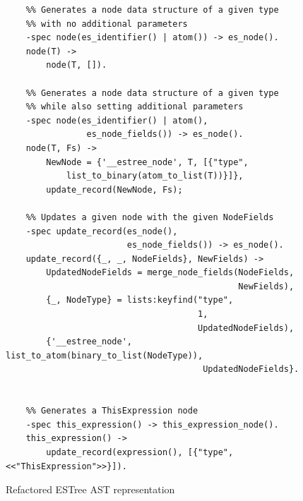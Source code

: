 \documentclass[twoside,12pt,titlepage,a4paper]{article}
\begin{document}
\begin{figure}[th]
	\centering
	\begin{verbatim}
	%% Generates a node data structure of a given type 
	%% with no additional parameters
	-spec node(es_identifier() | atom()) -> es_node().
	node(T) ->
		node(T, []).
	
	%% Generates a node data structure of a given type 
	%% while also setting additional parameters
	-spec node(es_identifier() | atom(),
				es_node_fields()) -> es_node().
	node(T, Fs) ->
		NewNode = {'__estree_node', T, [{"type", 
		    list_to_binary(atom_to_list(T))}]},
		update_record(NewNode, Fs);

	%% Updates a given node with the given NodeFields
	-spec update_record(es_node(),
	                    es_node_fields()) -> es_node().
	update_record({_, _, NodeFields}, NewFields) ->
		UpdatedNodeFields = merge_node_fields(NodeFields, 
		                                      NewFields),
		{_, NodeType} = lists:keyfind("type", 
	                                  1,
	                                  UpdatedNodeFields),
		{'__estree_node', list_to_atom(binary_to_list(NodeType)), 
		                               UpdatedNodeFields}.


	%% Generates a ThisExpression node
	-spec this_expression() -> this_expression_node().
	this_expression() ->
		update_record(expression(), [{"type", <<"ThisExpression">>}]).
	\end{verbatim}
	\caption{Refactored ESTree AST representation}
	\label{fig:estree_new:erl}
\end{figure}



\vskip 0.2in
%


\end{document}
